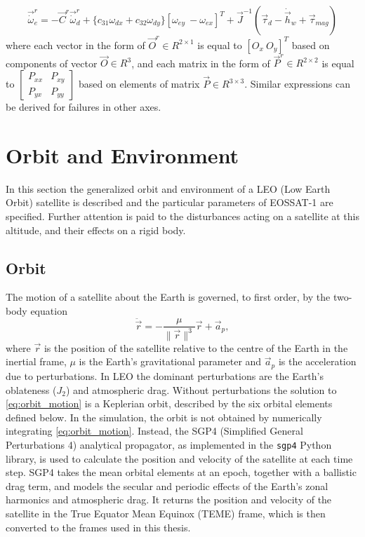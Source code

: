\begin{equation}
    \vec{\dot{\omega}}_e^r = - \vec{C}^r \vec{\dot{\omega}}_d^r + \{ c_{31} \omega_{dx} + c_{32} \omega_{dy} \} [\omega_{ey} \ -\omega_{ex}]^T + \vec{J}^{-1}(\vec{\tau}_d -\dot{\vec{h}}_w + \vec{\tau}_{mag})
\end{equation}
where each vector in the form of $ \vec{O}^r \in R^{2 \times 1} $ is equal
to  $ [O_x \ O_y]^T$ based on components of vector $\vec{O} \in R^3$, and
each matrix in the form of $\vec{P}^r \in R^{2 \times 2}$ is equal to
$\begin{bmatrix} P_{xx} & P_{xy} \\ P_{yx} & P_{yy} \end{bmatrix}$
based on elements of matrix $\vec{P} \in R^{3 \times 3}$. Similar expressions can be derived for failures in other axes.
\section{Orbit and Environment}
In this section the generalized orbit and environment of a LEO (Low Earth Orbit) satellite is described and the particular parameters of EOSSAT-1 are specified. Further attention is paid to the disturbances acting on a satellite at this altitude, and their effects on a rigid body.


\subsection{Orbit}

The motion of a satellite about the Earth is governed, to first order, by the two-body equation
\begin{equation}
    \ddot{\vec{r}} = -\frac{\mu}{\lVert\vec{r}\rVert^3}\vec{r} + \vec{a}_p,
    \label{eq:orbit_motion}
\end{equation}
where $\vec{r}$ is the position of the satellite relative to the centre of the Earth in the inertial frame, $\mu$ is the Earth's gravitational parameter and $\vec{a}_p$ is the acceleration due to perturbations. In LEO the dominant perturbations are the Earth's oblateness ($J_2$) and atmospheric drag. Without perturbations the solution to \eqref{eq:orbit_motion} is a Keplerian orbit, described by the six orbital elements defined below. In the simulation, the orbit is not obtained by numerically integrating \autoref{eq:orbit_motion}. Instead, the SGP4 (Simplified General Perturbations 4) analytical propagator, as implemented in the \texttt{sgp4} Python library, is used to calculate the position and velocity of the satellite at each time step. SGP4 takes the mean orbital elements at an epoch, together with a ballistic drag term, and models the secular and periodic effects of the Earth's zonal harmonics and atmospheric drag. It returns the position and velocity of the satellite in the True Equator Mean Equinox (TEME) frame, which is then converted to the frames used in this thesis.


